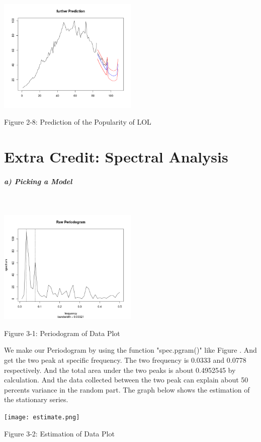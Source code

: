 \documentclass[11pt,a4paper]{article}
\begin{document}
\begin{center}
\includegraphics[width=0.5\textwidth]{furPre.png}
\end{center}
\begin{center}
{Figure 2-8: Prediction of the Popularity of LOL}
\end{center}
\newpage
\section*{Extra Credit: Spectral Analysis}
\subparagraph{a) Picking a Model}\mbox{}\\ 
\begin{center}
\includegraphics[width=0.5\textwidth]{Periodogram.png}
\end{center}
\begin{center}
{Figure 3-1: Periodogram of  Data Plot}
\end{center}

We make our Periodogram by using the function "spec.pgram()" like Figure  . And get the two peak at specific frequency. The two frequency is  0.0333 and 0.0778 respectively. And the total area under the two peaks is about 0.4952545 by calculation. And the data collected between the two peak can explain about 50 percents variance in the random part.
The graph below shows the estimation of the stationary series.
\begin{center}
\texttt{[image: estimate.png]}
\end{center}
\begin{center}
{Figure 3-2: Estimation of Data Plot}
\end{center}
\end{document}
